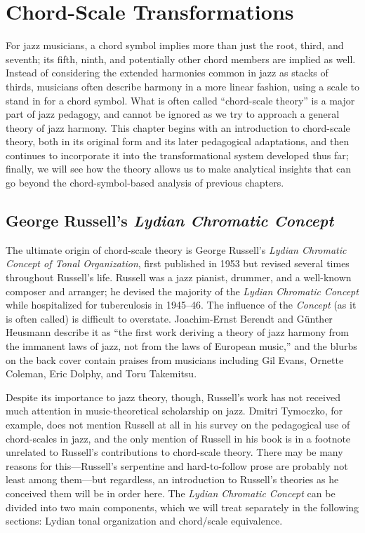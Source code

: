 
\chapter{Chord-Scale Transformations}
\label{chap:chord-scale-transformations}
\addtocspace


For jazz musicians, a chord symbol implies more than just the root, third, and
seventh; its fifth, ninth, and potentially other chord members are implied as
well. Instead of considering the extended harmonies common in jazz as stacks
of thirds, musicians often describe harmony in a more linear fashion, using a
scale to stand in for a chord symbol. What is often called ``chord-scale
theory'' is a major part of jazz pedagogy, and cannot be ignored as we try to
approach a general theory of jazz harmony. This chapter begins with an
introduction to chord-scale theory, both in its original form and its later
pedagogical adaptations, and then continues to incorporate it into the
transformational system developed thus far; finally, we will see how the
theory allows us to make analytical insights that can go beyond the
chord-symbol-based analysis of previous chapters.

\section{George Russell’s \emph{Lydian Chromatic Concept}}
\label{sec:lcc}

The ultimate origin of chord-scale theory is George Russell's \emph{Lydian
  Chromatic Concept of Tonal Organization}, first published in 1953 but
revised several times throughout Russell's life. Russell was a jazz
pianist, drummer, and a well-known composer and arranger; he devised the
majority of the \emph{Lydian Chromatic Concept} while hospitalized for
tuberculosis in 1945--46. The influence of the \emph{Concept} (as it
is often called) is difficult to overstate. Joachim-Ernst Berendt and Günther
Heusmann describe it as ``the first work deriving a theory of jazz harmony from
the immanent laws of jazz, not from the laws of European music,'' and the
blurbs on the back cover contain praises from musicians including Gil Evans,
Ornette Coleman, Eric Dolphy, and Toru Takemitsu.

Despite its importance to jazz theory, though, Russell's work has not received
much attention in music-theoretical scholarship on jazz. Dmitri Tymoczko, for
example, does not mention Russell at all in his survey on the pedagogical use
of chord-scales in jazz, and the only mention of Russell in his book is in a
footnote unrelated to Russell's contributions to chord-scale theory.
There may be many reasons for this---Russell's serpentine and hard-to-follow
prose are probably not least among them---but regardless, an introduction
to Russell's theories as he conceived them will be in order here. The
\emph{Lydian Chromatic Concept} can be divided into two main components, which
we will treat separately in the following sections: Lydian tonal organization and
chord/scale equivalence.

